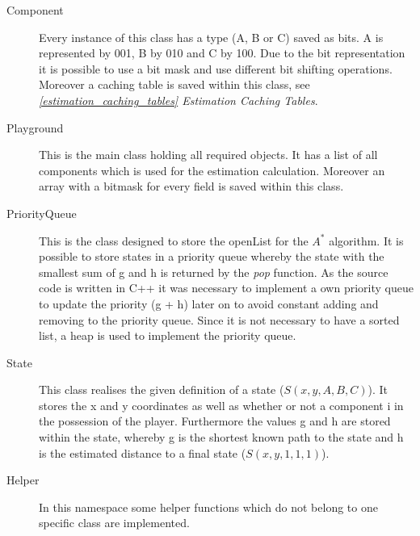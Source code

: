 \documentclass{article}
\begin{document}
\begin{description}
    \item[Component] Every instance of this class has a type (A, B or C) saved as bits. A is represented by 001, B by 010 and C by 100. Due to the bit representation it is possible to use a bit mask and use different bit shifting operations. Moreover a caching table is saved within this class, see \textit{\ref{estimation_caching_tables} Estimation Caching Tables}.
    \item[Playground] This is the main class holding all required objects. It has a list of all components which is used for the estimation calculation. Moreover an array with a bitmask for every field is saved within this class.
    \item[PriorityQueue] This is the class designed to store the openList for the $A^*$ algorithm. It is possible to store states in a priority queue whereby the state with the smallest sum of g and h is returned by the \textit{pop} function. As the source code is written in C++ it was necessary to implement a own priority queue to update the priority (g + h) later on to avoid constant adding and removing to the priority queue. Since it is not necessary to have a sorted list, a heap is used to implement the priority queue. 
    \item[State] This class realises the given definition of a state ($S(x,y,A,B,C)$). It stores the x and y coordinates as well as whether or not a component i in the possession of the player. Furthermore the values g and h are stored within the state, whereby g is the shortest known path to the state and h is the estimated distance to a final state ($S(x,y,1,1,1)$).
    \item[Helper] In this namespace some helper functions which do not belong to one specific class are implemented.
\end{description}

\end{document}

